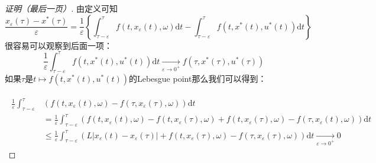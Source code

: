 \documentclass[UTF8, aspectratio=169, 9pt]{ctexbeamer}
\begin{document}
\begin{frame}
\begin{proof}[证明（最后一页）]
  由定义可知
  $$
  \frac{x_{\varepsilon}(\tau)-x^{*}(\tau)}{\varepsilon}=\frac{1}{\varepsilon}\left\{\int_{\tau-\varepsilon}^{\tau} f\left(t, x_{\varepsilon}(t), \omega\right) \mathrm{d} t-\int_{\tau-\varepsilon}^{\tau} f\left(t, x^{*}(t), u^{*}(t)\right) \mathrm{d} t\right\}
  $$
  很容易可以观察到后面一项：
  $$
  \frac{1}{\varepsilon} \int_{\tau-\varepsilon}^{\tau} f\left(t, x^{*}(t), u^{*}(t)\right) \mathrm{d} t \underset{\varepsilon \rightarrow 0^{+}}{\longrightarrow} f\left(\tau, x^{*}(\tau), u^{*}(\tau)\right)
  $$
  如果$\tau$是$t \mapsto f(t, x^*(t),u^*(t))$的Lebesgue point那么我们可以得到：
  
  \begin{align}
    \begin{split}
        \frac{1}{\varepsilon} \int_{\tau-\varepsilon}^{\tau} &\left(f\left(t, x_{\varepsilon}(t), \omega\right)-f\left(\tau, x_{\varepsilon}(\tau), \omega\right)\right) \mathrm{d} t \\
        &=\frac{1}{\varepsilon} \int_{\tau-\varepsilon}^{\tau}\left(f\left(t, x_{\varepsilon}(t), \omega\right)-f\left(t, x_{\varepsilon}(\tau), \omega\right)+f\left(t, x_{\varepsilon}(\tau), \omega\right)-f\left(\tau, x_{\varepsilon}(t), \omega\right)\right) \mathrm{d} t \\
        & \leq \frac{1}{\varepsilon} \int_{\tau-\varepsilon}^{\tau}\left(L\left|x_{\varepsilon}(t)-x_{\varepsilon}(\tau)\right|+f\left(t, x_{\varepsilon}(\tau), \omega\right)-f\left(\tau, x_{\varepsilon}(\tau), \omega\right)\right) \mathrm{d} t \underset{\varepsilon \rightarrow 0^{+}}{\longrightarrow} 0
    \end{split}
  \end{align}


\end{proof}
\end{frame}
\end{document}
